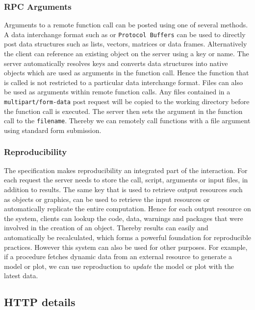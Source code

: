 \subsubsection{RPC Arguments}

Arguments to a remote function call can be posted using one of several methods. A data interchange format such as \JSON or \texttt{Protocol Buffers} can be used to directly post data structures such as lists, vectors, matrices or data frames. Alternatively the client can reference an existing object on the server using a key or name. The server automatically resolves keys and converts data structures into native objects which are used as arguments in the function call. Hence the function that is called is not restricted to a particular data interchange format. Files can also be used as arguments within remote function calls. Any files contained in a \texttt{multipart/form-data}  post request will be copied to the working directory before the function call is executed. The server then sets the argument in the function call to the \texttt{filename}. Thereby we can remotely call functions with a file argument using standard \HTML form submission.


\subsubsection{Reproducibility}

The \OpenCPU specification makes reproducibility an integrated part of the \API interaction. For each \RPC request the server needs to store the call, script, arguments or input files, in addition to results. The same key that is used to retrieve output resources such as objects or graphics, can be used to retrieve the input resources or automatically replicate the entire computation. Hence for each output resource on the system, clients can lookup the code, data, warnings and packages that were involved in the creation of an object. Thereby results can easily and automatically be recalculated, which forms a powerful foundation for reproducible practices. However this system can also be used for other purposes. For example, if a procedure fetches dynamic data from an external resource to generate a model or plot, we can use reproduction to \emph{update} the model or plot with the latest data.

\subsection{HTTP details}

